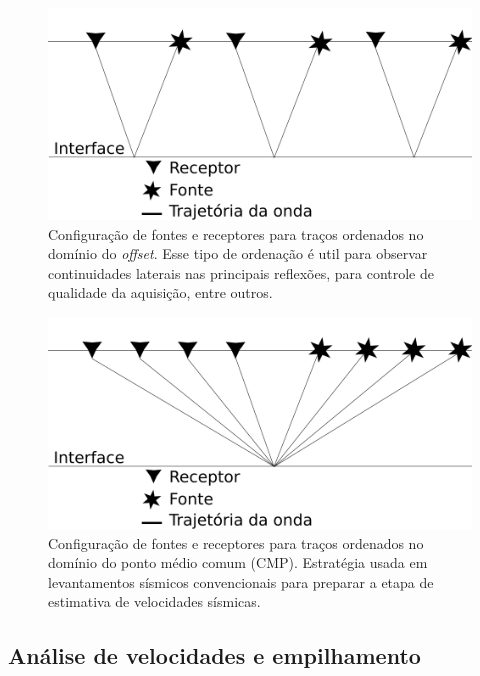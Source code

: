 \documentclass[
	12pt,				%
	openright,			%
	oneside,			%
	a4paper,			%
	english,			%
	brazil				%
	]{abntex2}
\begin{document}
    \begin{figure}[htp!]
        \centering
        \includegraphics[scale=0.4]{../imagens/offset.png}
        \caption{Configuração de fontes e receptores para traços ordenados no domínio do \textit{offset}. Esse tipo de ordenação é util para observar continuidades laterais nas principais reflexões, para controle de qualidade da aquisição, entre outros.}
        \label{offsetTrace}
    \end{figure}
    
    \begin{figure}[htp!]
        \centering
        \includegraphics[scale=0.4]{../imagens/cdp.png}
        \caption{Configuração de fontes e receptores para traços ordenados no domínio do ponto médio comum (CMP). Estratégia usada em levantamentos sísmicos convencionais para preparar a etapa de estimativa de velocidades sísmicas.}
        \label{cmpTrace}
    \end{figure}    

    \newpage
    \subsection*{Análise de velocidades e empilhamento}
    
\end{document}
